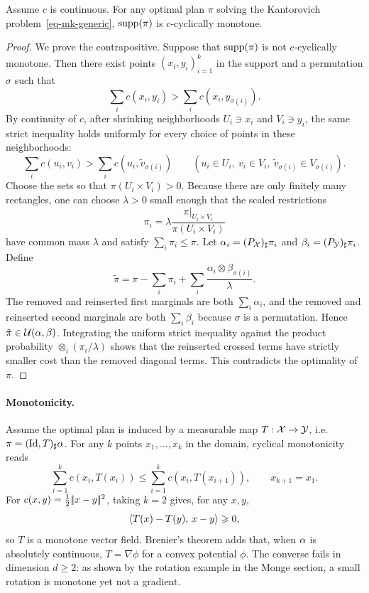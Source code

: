 \begin{thm}\label{thm:opt_ccm}
	Assume $c$ is continuous. For any optimal plan $\pi$ solving the Kantorovich problem~\eqref{eq-mk-generic}, $\operatorname{supp}(\pi)$ is $c$-cyclically monotone.
\end{thm}
\begin{proof}
	We prove the contrapositive. Suppose that $\operatorname{supp}(\pi)$ is not $c$-cyclically monotone. Then there exist points $(x_i,y_i)_{i=1}^k$ in the support and a permutation $\sigma$ such that
	\[
		\sum_i c(x_i,y_i)>
		\sum_i c(x_i,y_{\sigma(i)}).
	\]
	By continuity of $c$, after shrinking neighborhoods $U_i\ni x_i$ and $V_i\ni y_i$, the same strict inequality holds uniformly for every choice of points in these neighborhoods:
	\[
		\sum_i c(u_i,v_i)
		>
		\sum_i c(u_i,\tilde v_{\sigma(i)})
		\qquad
		(u_i\in U_i,\ v_i\in V_i,\ \tilde v_{\sigma(i)}\in V_{\sigma(i)}).
	\]
	Choose the sets so that $\pi(U_i\times V_i)>0$. Because there are only finitely many rectangles, one can choose $\lambda>0$ small enough that the scaled restrictions
	\[
		\pi_i=\lambda\frac{\pi|_{U_i\times V_i}}{\pi(U_i\times V_i)}
	\]
	have common mass $\lambda$ and satisfy $\sum_i\pi_i\leq\pi$. Let $\alpha_i=(P_{\mathcal{X}})_\sharp\pi_i$ and $\beta_i=(P_{\mathcal{Y}})_\sharp\pi_i$. Define
	\[
		\tilde\pi
		=
		\pi-\sum_i\pi_i
		+\sum_i \frac{\alpha_i\otimes\beta_{\sigma(i)}}{\lambda}.
	\]
	The removed and reinserted first marginals are both $\sum_i\alpha_i$, and the removed and reinserted second marginals are both $\sum_i\beta_i$ because $\sigma$ is a permutation. Hence $\tilde\pi\in\mathcal{U}(\alpha,\beta)$. Integrating the uniform strict inequality against the product probability $\otimes_i(\pi_i/\lambda)$ shows that the reinserted crossed terms have strictly smaller cost than the removed diagonal terms. This contradicts the optimality of $\pi$.
\end{proof}

\paragraph{Monotonicity.}

Assume the optimal plan is induced by a measurable map $T:\mathcal{X}\to\mathcal{Y}$, i.e. $\pi=(\mathrm{Id},T)_\sharp\alpha$. For any $k$ points $x_1,\ldots,x_k$ in the domain, cyclical monotonicity reads
\[
	\sum_{i=1}^k c(x_i,T(x_i))
	\leq
	\sum_{i=1}^k c(x_i,T(x_{i+1})),
	\qquad x_{k+1}=x_1.
\]
For $c(x,y)=\frac12|\!| x-y |\!|^2$, taking $k=2$ gives, for any $x,y$,
\[
	\langle T(x)-T(y),\,x-y\rangle\geqslant0,
\]
so $T$ is a monotone vector field. Brenier's theorem adds that, when $\alpha$ is absolutely continuous, $T=\nabla\phi$ for a convex potential $\phi$. The converse fails in dimension $d\geq2$: as shown by the rotation example in the Monge section, a small rotation is monotone yet not a gradient.

